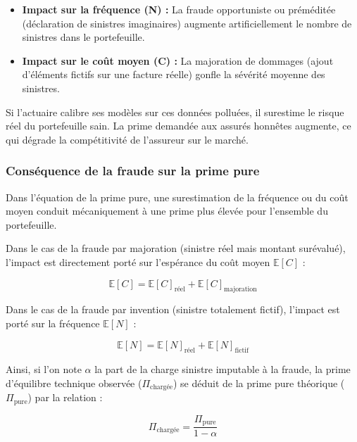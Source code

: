 \begin{itemize}[label = $\bullet$]
    \item \textbf{Impact sur la fréquence (N) :} La fraude opportuniste ou préméditée (déclaration de sinistres imaginaires) augmente artificiellement le nombre de sinistres dans le portefeuille.
    \item \textbf{Impact sur le coût moyen (C) :} La majoration de dommages (ajout d'éléments fictifs sur une facture réelle) gonfle la sévérité moyenne des sinistres.
\end{itemize}

Si l'actuaire calibre ses modèles sur ces données polluées, il surestime le risque réel du portefeuille sain. La prime demandée aux assurés honnêtes augmente, ce qui dégrade la compétitivité de l'assureur sur le marché.

\subsubsection{Conséquence de la fraude sur la prime pure}

Dans l'équation de la prime pure, une surestimation de la fréquence ou du coût moyen conduit mécaniquement à une prime plus élevée pour l'ensemble du portefeuille.

Dans le cas de la fraude par majoration (sinistre réel mais montant surévalué), l'impact est directement porté sur l'espérance du coût moyen $\mathbb{E}[C]$ :

\begin{equation}
    \mathbb{E}[C] = \mathbb{E}[C]_{\text{réel}} + \mathbb{E}[C]_{\text{majoration}}
\end{equation}

Dans le cas de la fraude par invention (sinistre totalement fictif), l'impact est porté sur la fréquence $\mathbb{E}[N]$ :

\begin{equation}
    \mathbb{E}[N] = \mathbb{E}[N]_{\text{réel}} + \mathbb{E}[N]_{\text{fictif}}
\end{equation}

Ainsi, si l'on note $\alpha$ la part de la charge sinistre imputable à la fraude, la prime d'équilibre technique observée ($\Pi_{\text{chargée}}$) se déduit de la prime pure théorique ($\Pi_{\text{pure}}$) par la relation :

\begin{equation}
    \Pi_{\text{chargée}} = \frac{\Pi_{\text{pure}}}{1 - \alpha}
\end{equation}

